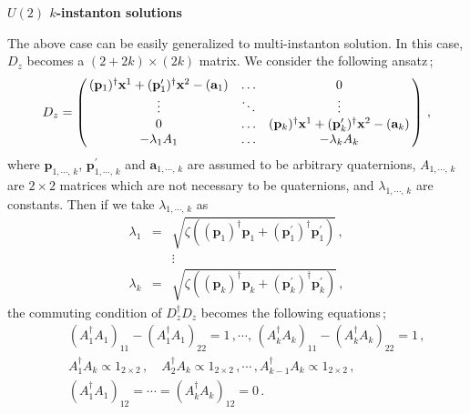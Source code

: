 \documentclass[a4paper,12pt]{article}
\begin{document}

\begin{flushleft}
\textbf{$U(2)$ $k$-instanton solutions}
\end{flushleft}

The above case can be easily generalized to multi-instanton solution. 
In this case, $D_{z}$ becomes a $(2+2k)\times (2k)$ matrix.
We consider the following ansatz\,;
\begin{equation}
D_z =
 \left( \begin{array}{@{\,}ccc@{\,}}
 (\mathbf{p}_1)^{\dagger}\mathbf{x}^1 +(\mathbf{p}_1^{\prime})^{\dagger}
\mathbf{x}^2 -(\mathbf{a}_1)
  &\ldots &  0  \\
   \vdots & \ddots  & \vdots  \\
   0  &\ldots &  
(\mathbf{p}_k)^{\dagger} \mathbf{x}^1 +(\mathbf{p}_k^{\prime})^{\dagger}
\mathbf{x}^2 -(\mathbf{a}_k)  \\
 -\lambda _1 A_{1} & \ldots & -\lambda_k A_{k} 
  \end{array}  \right)\,,
\end{equation}
where $\mathbf{p}_{1,\cdots,\,k}$, $\mathbf{p}^{\prime}_{1,\cdots,\,k}$ 
and $\mathbf{a}_{1,\cdots,\,k}$ are assumed 
to be arbitrary quaternions, $A_{1,\cdots,\,k}$ are $2\times 2$ matrices 
which are not necessary to 
be quaternions, and $\lambda_{1,\cdots,\,k}$ are constants.
Then if we take $\lambda_{1,\cdots,\,k}$ as 
\begin{eqnarray}
\lambda _1 &=& \sqrt{ \zeta \left(   
(\mathbf{p}_{1})^{\dagger}\mathbf{p}_{1} + (\mathbf{p}_{1}^{\prime})^{\dagger}
\mathbf{p}_{1}^{\prime} \right)}\,,\\
& & \vdots \nonumber\\
\lambda _k &=& \sqrt{ \zeta \left( 
(\mathbf{p}_{k})^{\dagger}\mathbf{p}_{k} + (\mathbf{p}_{k}^{\prime})^{\dagger}
\mathbf{p}_{k}^{\prime} \right)}\,,
\end{eqnarray}
the commuting condition of $D_z^{\dagger}D_z$ becomes the following 
equations\,;
\begin{eqnarray}
& &  (A_{1}^{\dagger}A_{1})_{11}-(A_{1}^{\dagger}A_{1})_{22} = 1 \,,
\cdots,\, (A_{k}^{\dagger}A_{k})_{11}-(A_{k}^{\dagger}A_{k})_{22}  = 1 \,, \\
& & A_{1}^{\dagger}A_{k}\propto 1_{2\times 2}\,,\quad 
 A_{2}^{\dagger}A_{k}\propto 1_{2\times 2}\,,\cdots\,,A_{k-1}^{\dagger}A_{k}
\propto 1_{2\times 2}\,,\\
& & (A_{1}^{\dagger}A_{1})_{12}=\cdots =(A_{k}^{\dagger}A_{k})_{12}=0\,.
\end{eqnarray}
\end{document}
